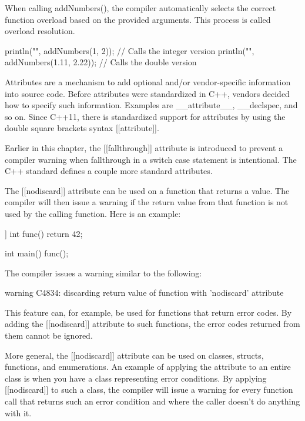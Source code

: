 When calling addNumbers(), the compiler automatically selects the correct function overload based on the provided arguments. This process is called overload resolution.

\begin{cpp}
println("{}", addNumbers(1, 2)); // Calls the integer version
println("{}", addNumbers(1.11, 2.22)); // Calls the double version
\end{cpp}


Attributes are a mechanism to add optional and/or vendor-specific information into source code. Before attributes were standardized in C++, vendors decided how to specify such information. Examples are \_\_attribute\_\_, \_\_declspec, and so on. Since C++11, there is standardized support for attributes by using the double square brackets syntax [[attribute]].

Earlier in this chapter, the [[fallthrough]] attribute is introduced to prevent a compiler warning when fallthrough in a switch case statement is intentional. The C++ standard defines a couple more standard attributes.

\mySamllsection{[[nodiscard]]}

The [[nodiscard]] attribute can be used on a function that returns a value. The compiler will then issue a warning if the return value from that function is not used by the calling function. Here is an example:

\begin{cpp}
[[nodiscard]] int func() { return 42; }

int main()
{
    func();
}
\end{cpp}

The compiler issues a warning similar to the following:

\begin{shell}
warning C4834: discarding return value of function with 'nodiscard' attribute
\end{shell}

This feature can, for example, be used for functions that return error codes. By adding the [[nodiscard]] attribute to such functions, the error codes returned from them cannot be ignored.

More general, the [[nodiscard]] attribute can be used on classes, structs, functions, and enumerations. An example of applying the attribute to an entire class is when you have a class representing error conditions. By applying [[nodiscard]] to such a class, the compiler will issue a warning for every function call that returns such an error condition and where the caller doesn’t do anything with it.

